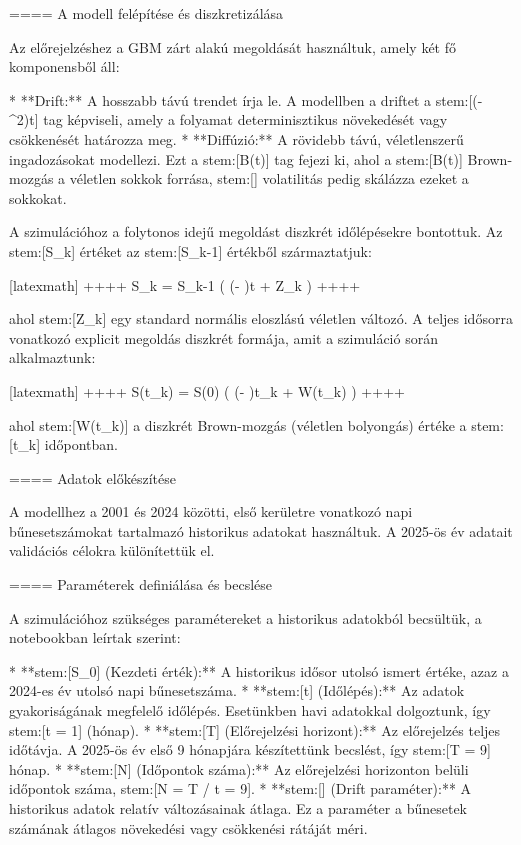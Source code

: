 \documentclass[11pt]{article}
\begin{document}
==== A modell felépítése és diszkretizálása

Az előrejelzéshez a GBM zárt alakú megoldását használtuk, amely két fő komponensből áll:

*   **Drift:** A hosszabb távú trendet írja le. A modellben a driftet a stem:[(\mu - \sigma^2)t] tag képviseli, amely a folyamat determinisztikus növekedését vagy csökkenését határozza meg.
*   **Diffúzió:** A rövidebb távú, véletlenszerű ingadozásokat modellezi. Ezt a stem:[\sigma B(t)] tag fejezi ki, ahol a stem:[B(t)] Brown-mozgás a véletlen sokkok forrása, stem:[\sigma] volatilitás pedig skálázza ezeket a sokkokat.

A szimulációhoz a folytonos idejű megoldást diszkrét időlépésekre bontottuk. Az stem:[S_k] értéket az stem:[S_{k-1}] értékből származtatjuk:

[latexmath]
++++
S_k = S_{k-1} \cdot \exp\left( \left(\mu - \right)\Delta t + \sigma {} Z_k \right)
++++

ahol stem:[Z_k] egy standard normális eloszlású véletlen változó. A teljes idősorra vonatkozó explicit megoldás diszkrét formája, amit a szimuláció során alkalmaztunk:

[latexmath]
++++
S(t_k) = S(0) \exp\left( \left(\mu - \right)t_k + \sigma W(t_k) \right)
++++

ahol stem:[W(t_k)] a diszkrét Brown-mozgás (véletlen bolyongás) értéke a stem:[t_k] időpontban.

==== Adatok előkészítése

A modellhez a 2001 és 2024 közötti, első kerületre vonatkozó napi bűnesetszámokat tartalmazó historikus adatokat használtuk. A 2025-ös év adatait validációs célokra különítettük el.

==== Paraméterek definiálása és becslése

A szimulációhoz szükséges paramétereket a historikus adatokból becsültük, a notebookban leírtak szerint:

*   **stem:[S_0] (Kezdeti érték):** A historikus idősor utolsó ismert értéke, azaz a 2024-es év utolsó napi bűnesetszáma.
*   **stem:[\Delta t] (Időlépés):** Az adatok gyakoriságának megfelelő időlépés. Esetünkben havi adatokkal dolgoztunk, így stem:[\Delta t = 1] (hónap).
*   **stem:[T] (Előrejelzési horizont):** Az előrejelzés teljes időtávja. A 2025-ös év első 9 hónapjára készítettünk becslést, így stem:[T = 9] hónap.
*   **stem:[N] (Időpontok száma):** Az előrejelzési horizonton belüli időpontok száma, stem:[N = T / \Delta t = 9].
*   **stem:[\mu] (Drift paraméter):** A historikus adatok relatív változásainak átlaga. Ez a paraméter a bűnesetek számának átlagos növekedési vagy csökkenési rátáját méri.
\end{document}
